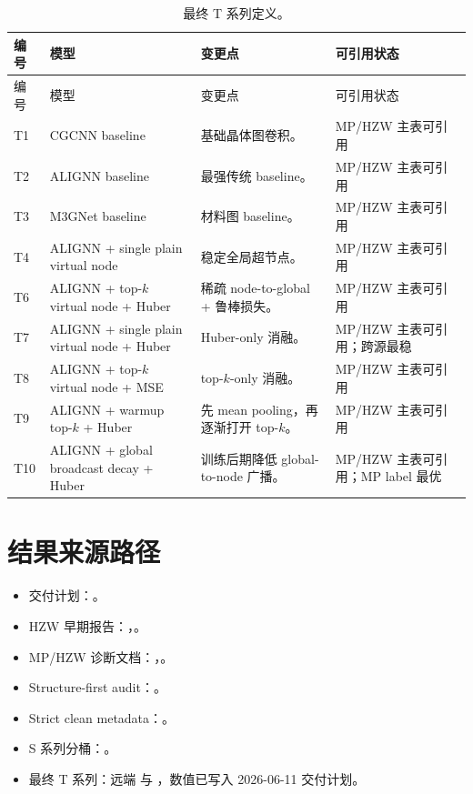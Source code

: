 \documentclass[UTF8,a4paper,11pt]{ctexart}
\begin{document}
\begin{longtable}{p{1.3cm} p{5.0cm} p{5.6cm} p{3.0cm}}
\caption{最终 T 系列定义。}
\label{tab:t-definitions}\\
\toprule
编号 & 模型 & 变更点 & 可引用状态 \\
\midrule
\endfirsthead
\toprule
编号 & 模型 & 变更点 & 可引用状态 \\
\midrule
\endhead
T1 & CGCNN baseline & 基础晶体图卷积。 & MP/HZW 主表可引用 \\
T2 & ALIGNN baseline & 最强传统 baseline。 & MP/HZW 主表可引用 \\
T3 & M3GNet baseline & 材料图 baseline。 & MP/HZW 主表可引用 \\
T4 & ALIGNN + single plain virtual node & 稳定全局超节点。 & MP/HZW 主表可引用 \\
T6 & ALIGNN + top-$k$ virtual node + Huber & 稀疏 node-to-global + 鲁棒损失。 & MP/HZW 主表可引用 \\
T7 & ALIGNN + single plain virtual node + Huber & Huber-only 消融。 & MP/HZW 主表可引用；跨源最稳 \\
T8 & ALIGNN + top-$k$ virtual node + MSE & top-$k$-only 消融。 & MP/HZW 主表可引用 \\
T9 & ALIGNN + warmup top-$k$ + Huber & 先 mean pooling，再逐渐打开 top-$k$。 & MP/HZW 主表可引用 \\
T10 & ALIGNN + global broadcast decay + Huber & 训练后期降低 global-to-node 广播。 & MP/HZW 主表可引用；MP label 最优 \\
\bottomrule
\end{longtable}

\section{结果来源路径}

\begin{itemize}
  \item 交付计划：。
  \item HZW 早期报告：，。
  \item MP/HZW 诊断文档：，。
  \item Structure-first audit：。
  \item Strict clean metadata：。
  \item S 系列分桶：。
  \item 最终 T 系列：远端  与 ，数值已写入 2026-06-11 交付计划。
\end{itemize}
\end{document}
